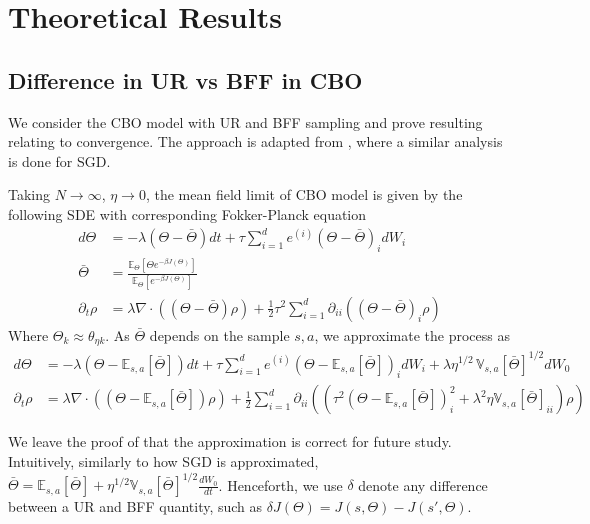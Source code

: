 \documentclass[10.5pt]{article}
\newcommand\bb{\mathbb}
\begin{document}
\section{Theoretical Results}
\subsection{Difference in UR vs BFF in CBO}
We consider the CBO model with UR and BFF sampling and prove resulting relating to convergence. The approach is adapted from \cite{zhu2020borrowing}, where a similar analysis is done for SGD.

Taking $N\to \infty$, $\eta\to 0$, the mean field limit of CBO model is given by the following SDE with corresponding Fokker-Planck equation
\begin{align*}
  d\Theta &= -\lambda(\Theta - \bar \Theta)dt + \tau \sum_{i=1}^d e^{(i)} (\Theta - \bar \Theta)_i dW_i \\
  \bar \Theta &= \frac{\bb E_\Theta[ \Theta e^{-\beta J(\Theta)} ]}{\bb E_\Theta[e^{-\beta J(\Theta)}]}\\
  \partial_t \rho &= \lambda \nabla \cdot ((\Theta - \bar \Theta) \rho ) + \frac{1}{2}\tau^2 \sum_{i=1}^d\partial_{ii}((\Theta - \bar \Theta)_i \rho)
\end{align*}
Where $\Theta_{k}\approx \theta_{\eta k}$.
As $\bar \Theta$ depends on the sample $s,a$, we approximate the process as
\begin{align*}
  d\Theta &= -\lambda (\Theta - \bb E_{s,a}[\bar \Theta])dt + \tau \sum_{i=1}^d e^{(i)} (\Theta - \bb E_{s,a}[\bar \Theta])_i dW_i + \lambda \eta^{1/2}\, \bb V_{s,a}[\bar\Theta]^{1/2}  dW_0\\
  \partial_t \rho &= \lambda \nabla \cdot ((\Theta - \bb E_{s,a}[\bar \Theta]) \rho ) + \frac{1}{2} \sum_{i=1}^d\partial_{ii}((\tau^2(\Theta - \bb E_{s,a}[\bar \Theta])^2_i+\lambda^2\eta \bb V_{s,a}[\bar \Theta]_{ii} ) \rho)
\end{align*}

We leave the proof of that the approximation is correct for future study. Intuitively, similarly to how SGD is approximated, $\bar \Theta = \bb E_{s,a}[\bar \Theta] + \eta^{1/2}\bb V_{s,a}[\bar \Theta]^{1/2}\frac{dW_0}{dt}$.
Henceforth, we use $\delta$ denote any difference between a UR and BFF quantity, such as $\delta J(\Theta)= J(s,\Theta) - J(s',\Theta)$.
\end{document}
